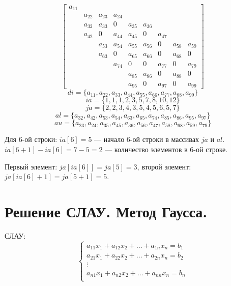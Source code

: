 \begin{example}
    \[\begin{bmatrix}
            a_{11} &                                                                       \\
                   & a_{22} & a_{23} & a_{24}                                              \\
                   & a_{32} & a_{33} & 0      & a_{35} & a_{36}                            \\
                   & a_{42} & 0      & a_{44} & a_{45} & 0      & a_{47}                   \\
                   &        & a_{53} & a_{54} & a_{55} & a_{56} & 0      & a_{58} & a_{59} \\
                   &        & a_{63} & 0      & a_{65} & a_{66} & 0      & a_{68} & 0      \\
                   &        &        & a_{74} & 0      & 0      & a_{77} & 0      & a_{79} \\
                   &        &        &        & a_{85} & a_{86} & 0      & a_{88} & 0      \\
                   &        &        &        & a_{95} & 0      & a_{97} & 0      & a_{99}
        \end{bmatrix} \]
    \[di = \{a_{11}, a_{22}, a_{33}, a_{44}, a_{55}, a_{66}, a_{77}, a_{88}, a_{99}\}\]
    \[ia = \{1, 1, 1, 2, 3, 5, 7, 8, 10, 12\}\]
    \[ja = \{2, 2, 3, 4, 3, 5, 4, 5, 6, 5, 7\}\]
    \[al = \{a_{32}, a_{42}, a_{53}, a_{54}, a_{63}, a_{65}, a_{74}, a_{85}, a_{86}, a_{95}, a_{97}\}\]
    \[au = \{a_{23}, a_{24}, a_{35}, a_{45}, a_{36}, a_{56}, a_{47}, a_{58}, a_{68}, a_{59}, a_{79}\}\]

    Для 6-ой строки: \(ia[6] = 5\) --- начало 6-ой строки в массивах \(ja\) и \(al\). \(ia[6 + 1] - ia[6] = 7 - 5 = 2\) --- количество элементов в 6-ой строке.

    Первый элемент: \(ja[ia[6]] = ja[5] = 3\), второй элемент: \(ja[ia[6] + 1] = ja[5 + 1] = 5\).
\end{example}


\section{Решение СЛАУ. Метод Гаусса.}

СЛАУ:
\begin{equation}
    \label{СЛАУ}
    \begin{cases}
        a_{11} x_1 + a_{12} x_2 + \dots + a_{1n} x_n = b_1 \\
        a_{21} x_1 + a_{22} x_2 + \dots + a_{2n} x_n = b_2 \\
        \vdots                                             \\
        a_{n1} x_1 + a_{n2} x_2 + \dots + a_{nn} x_n = b_n \\
    \end{cases}
\end{equation}

